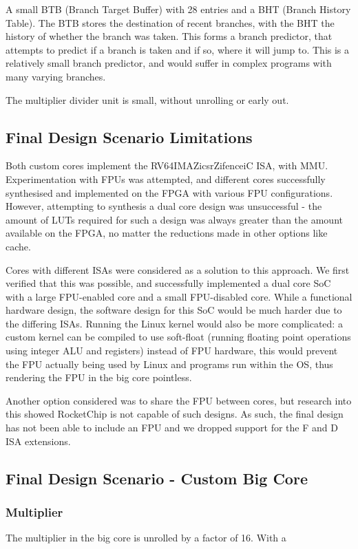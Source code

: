 A small BTB (Branch Target Buffer) with 28 entries and a BHT (Branch History Table). The BTB stores the destination of recent branches, with the BHT the history of whether the branch was taken. This forms a branch predictor, that attempts to predict if a branch is taken and if so, where it will jump to. This is a relatively small branch predictor, and would suffer in complex programs with many varying branches.

The multiplier divider unit is small, without unrolling or early out. 

\subsection{Final Design Scenario Limitations}
Both custom cores implement the RV64IMAZicsrZifenceiC ISA, with MMU. Experimentation with FPUs was attempted, and different cores successfully synthesised and implemented on the FPGA with various FPU configurations. However, attempting to synthesis a dual core design was unsuccessful - the amount of LUTs required for such a design was always greater than the amount available on the FPGA, no matter the reductions made in other options like cache.

Cores with different ISAs were considered as a solution to this approach. We first verified that this was possible, and successfully implemented a dual core SoC with a large FPU-enabled core and a small FPU-disabled core. While a functional hardware design, the software design for this SoC would be much harder due to the differing ISAs. Running the Linux kernel would also be more complicated: a custom kernel can be compiled to use soft-float (running floating point operations using integer ALU and registers) instead of FPU hardware, this would prevent the FPU actually being used by Linux and programs run within the OS, thus rendering the FPU in the big core pointless.

Another option considered was to share the FPU between cores, but research into this showed RocketChip is not capable of such designs. As such, the final design has not been able to include an FPU and we dropped support for the F and D ISA extensions.


\subsection{Final Design Scenario - Custom Big Core}
\subsubsection{Multiplier} %
The multiplier in the big core is unrolled by a factor of 16. With a 

